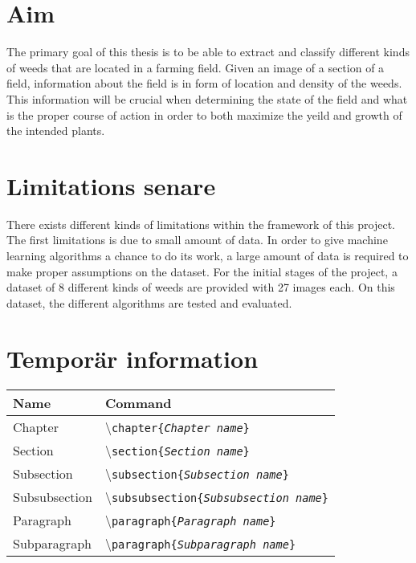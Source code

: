 \section{Aim}

The primary goal of this thesis is to be able to extract and classify different kinds of weeds that are located in a farming field. Given an image of a section of a field, information about the field is in form of location and density of the weeds. This information will be crucial when determining the state of the field and what is the proper course of action in order to both maximize the yeild and growth of the intended plants.

\section{Limitations \textbf{senare}}

There exists different kinds of limitations within the framework of this project. The first limitations is due to small amount of data. In order to give machine learning algorithms a chance to do its work, a large amount of data is required to make proper assumptions on the dataset. For the initial stages of the project, a dataset of 8 different kinds of weeds are provided with 27 images each. On this dataset, the different algorithms are tested and evaluated.

\section{Temporär information}

\begin{table}[H]
\centering
\begin{tabular}{ll} \hline\hline
Name & Command\\ \hline
Chapter & \textbackslash\texttt{chapter\{\emph{Chapter name}\}}\\
Section & \textbackslash\texttt{section\{\emph{Section name}\}}\\
Subsection & \textbackslash\texttt{subsection\{\emph{Subsection name}\}}\\
Subsubsection & \textbackslash\texttt{subsubsection\{\emph{Subsubsection name}\}}\\
Paragraph & \textbackslash\texttt{paragraph\{\emph{Paragraph name}\}}\\
Subparagraph & \textbackslash\texttt{paragraph\{\emph{Subparagraph name}\}}\\ \hline\hline
\end{tabular}
\end{table}
